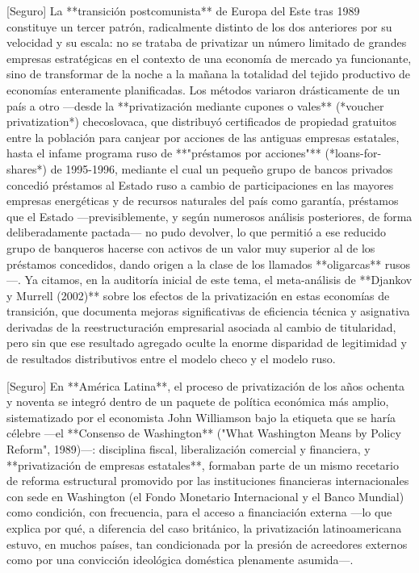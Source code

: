 \documentclass[10pt,a4paper]{article}
\begin{document}
[Seguro] La **transición postcomunista** de Europa del Este tras 1989 constituye un tercer patrón, radicalmente distinto de los dos anteriores por su velocidad y su escala: no se trataba de privatizar un número limitado de grandes empresas estratégicas en el contexto de una economía de mercado ya funcionante, sino de transformar de la noche a la mañana la totalidad del tejido productivo de economías enteramente planificadas. Los métodos variaron drásticamente de un país a otro —desde la **privatización mediante cupones o vales** (*voucher privatization*) checoslovaca, que distribuyó certificados de propiedad gratuitos entre la población para canjear por acciones de las antiguas empresas estatales, hasta el infame programa ruso de **"préstamos por acciones"** (*loans-for-shares*) de 1995-1996, mediante el cual un pequeño grupo de bancos privados concedió préstamos al Estado ruso a cambio de participaciones en las mayores empresas energéticas y de recursos naturales del país como garantía, préstamos que el Estado —previsiblemente, y según numerosos análisis posteriores, de forma deliberadamente pactada— no pudo devolver, lo que permitió a ese reducido grupo de banqueros hacerse con activos de un valor muy superior al de los préstamos concedidos, dando origen a la clase de los llamados **oligarcas** rusos—. Ya citamos, en la auditoría inicial de este tema, el meta-análisis de **Djankov y Murrell (2002)** sobre los efectos de la privatización en estas economías de transición, que documenta mejoras significativas de eficiencia técnica y asignativa derivadas de la reestructuración empresarial asociada al cambio de titularidad, pero sin que ese resultado agregado oculte la enorme disparidad de legitimidad y de resultados distributivos entre el modelo checo y el modelo ruso.

[Seguro] En **América Latina**, el proceso de privatización de los años ochenta y noventa se integró dentro de un paquete de política económica más amplio, sistematizado por el economista John Williamson bajo la etiqueta que se haría célebre —el **Consenso de Washington** ("What Washington Means by Policy Reform", 1989)—: disciplina fiscal, liberalización comercial y financiera, y **privatización de empresas estatales**, formaban parte de un mismo recetario de reforma estructural promovido por las instituciones financieras internacionales con sede en Washington (el Fondo Monetario Internacional y el Banco Mundial) como condición, con frecuencia, para el acceso a financiación externa —lo que explica por qué, a diferencia del caso británico, la privatización latinoamericana estuvo, en muchos países, tan condicionada por la presión de acreedores externos como por una convicción ideológica doméstica plenamente asumida—.
\end{document}
